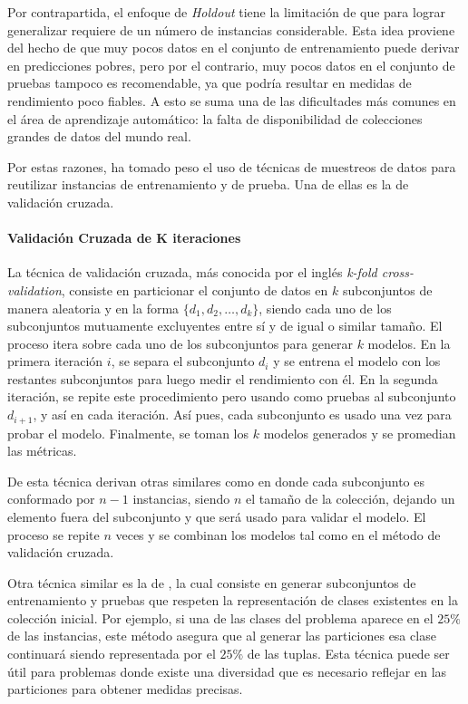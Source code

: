 Por contrapartida, el enfoque de \textit{Holdout} tiene la limitación de que
para lograr generalizar requiere de un número de instancias considerable.
 Esta idea proviene del hecho de que muy pocos datos en el
conjunto de entrenamiento puede derivar en predicciones pobres, pero por el
contrario, muy pocos datos en el conjunto de pruebas tampoco es recomendable, ya
que podría resultar en medidas de rendimiento poco fiables. A esto se suma una
de las dificultades más comunes en el área de aprendizaje automático: la falta
de disponibilidad de colecciones grandes de datos del mundo real.

Por estas razones, ha tomado peso el uso de técnicas de muestreos de datos para
reutilizar instancias de entrenamiento y de prueba. Una de ellas es la de
validación cruzada.

\paragraph{Validación Cruzada de K iteraciones}

La técnica de validación cruzada, más conocida por el inglés \textit{k-fold
	cross-validation}, consiste en particionar el conjunto de datos en $k$
subconjuntos de manera aleatoria y en la forma $\{d_{1}, d_{2},  \dots, d_{k}
	\}$, siendo cada uno de los subconjuntos mutuamente excluyentes entre sí y de
igual o similar tamaño. El proceso itera sobre cada uno de los subconjuntos para
generar $k$ modelos. En la primera iteración $i$, se separa el subconjunto
$d_{i}$ y se entrena el modelo con los restantes subconjuntos para luego medir
el rendimiento con él. En la segunda iteración, se repite este procedimiento
pero usando como pruebas al subconjunto $d_{i+1}$, y así en cada iteración. Así
pues, cada subconjunto es usado una vez para probar el modelo. Finalmente, se
toman los $k$ modelos generados y se promedian las métricas.

De esta técnica derivan otras similares como 
en donde cada subconjunto es conformado por $n-1$ instancias, siendo $n$ el
tamaño de la colección, dejando un elemento fuera del subconjunto y que será
usado para validar el modelo. El proceso se repite $n$ veces y se combinan los
modelos tal como en el método de validación cruzada.

Otra técnica similar es la de , la
cual consiste en generar subconjuntos de entrenamiento y pruebas que respeten la
representación de clases existentes en la colección inicial. Por ejemplo, si una
de las clases del problema aparece en el $25\%$ de las instancias, este método
asegura que al generar las particiones esa clase continuará siendo representada
por el $25\%$ de las tuplas. Esta técnica puede ser útil para problemas donde
existe una diversidad que es necesario reflejar en las particiones para obtener
medidas precisas.

